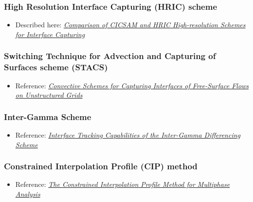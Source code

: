 \subsubsection{High Resolution Interface Capturing (HRIC) scheme}

\begin{itemize}
    \item Described here: \textit{\href{http://warminski.pollub.plwww.ptmts.org.pl/Waclaw-Koron-2-08.pdf}{Comparison of CICSAM and HRIC High-resolution Sche\-mes for Interface Capturing}}
\end{itemize}

\subsubsection{Switching Technique for Advection and Capturing of Surfaces scheme (STACS)}

\begin{itemize}
    \item Reference: \textit{\href{http://webfea-lb.fea.aub.edu.lb/cfd/pdfs/publications2/STACS-Complete.pdf}{Convective Schemes for Capturing Interfaces of Free-Surface Flows on Unstructured Grids}}
\end{itemize}

\subsubsection{Inter-Gamma Scheme}

\begin{itemize}
    \item Reference: \textit{\href{http://powerlab.fsb.hr/ped/kturbo/openfoam/docs/InterTrack.pdf}{Interface Tracking Capabilities of the Inter-Gamma Differencing Scheme}}
\end{itemize}

\subsubsection{Constrained Interpolation Profile (CIP) method}


\begin{itemize}
    \item Reference: \textit{\href{http://www.mech.titech.ac.jp/~ryuutai/paper/JCP2001CIPReviewYabe.pdf}{The Constrained Interpolation Profile Method for Multiphase Analysis}}
\end{itemize}

